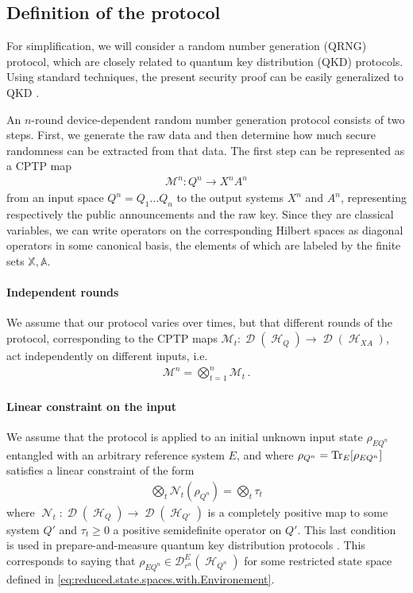 \documentclass[11pt]{article}
\newcommand{\1}{\ensuremath{\mathbbm{1}}}
\theoremstyle{newdefinition}
\theoremstyle{newplain}
\theoremstyle{myplain}
\DeclareMathOperator{\cH}{\mathcal{H}}
\DeclareMathOperator{\cD}{\mathcal{D}}
\DeclareMathOperator{\cN}{\mathcal{N}}
\begin{document}
\subsection{Definition of the protocol}
\label{subsec:protocol_definition}
For simplification, we will consider a random number generation (QRNG) protocol, which are closely related to quantum key distribution (QKD) protocols. Using standard techniques, the present security proof can be easily generalized to QKD \cite{Renner.2006, Himbeeck.2025}. 

An $n$-round device-dependent random number generation protocol consists of two steps. First, we generate the raw data and then determine how much secure randomness can be extracted from that data. The first step can be represented as a CPTP map
\begin{align}
    \mathcal M^n: Q^n \to X^nA^n
\end{align}
from an input space $Q^n=Q_1 \dots Q_n$ to the output systems $X^n$ and $A^n$, representing respectively the public announcements and the raw key. Since they are classical variables, 
we can write operators on the corresponding Hilbert spaces as diagonal operators in some canonical basis, the elements of which are labeled by the finite sets $\mathbb{X},\mathbb{A}$. 


\paragraph{Independent rounds}
We assume that our protocol varies over times, but that different rounds of the protocol, corresponding to the CPTP maps $\mathcal M_t: \cD(\cH_{Q})\to \cD(\cH_{XA})$, act independently on different inputs, i.e.
\begin{align}
    \mathcal M^n = \bigotimes_{t=1}^n \mathcal M_t\,.
\end{align}

\paragraph{Linear constraint on the input}
We assume that the protocol is applied to an initial unknown input state $\rho_{EQ^n}$ entangled with an arbitrary reference system $E$, and where $\rho_{Q^n} = \Tr_E[\rho_{EQ^n}]$ satisfies a linear constraint of the form 
\begin{align}
    \label{eq:assumptionQKD}
    \bigotimes_t \mathcal{N}_t(\rho_{Q^n}) = \bigotimes_t \tau_t
\end{align}
where $\cN_t: \cD(\cH_Q)\to \cD(\cH_{Q'})$ is a completely positive map to some system $Q'$ and $\tau_t\geq 0$ a positive semidefinite operator on $Q'$. This last condition is used in prepare-and-measure quantum key distribution protocols \cite{Winick.2018}. This corresponds to saying that $\rho_{EQ^n}\in \mathcal D^E_{r^n}(\cH_{Q^n})$ for some restricted state space defined in \eqref{eq:reduced.state.spaces.with.Environement}.
\end{document}
